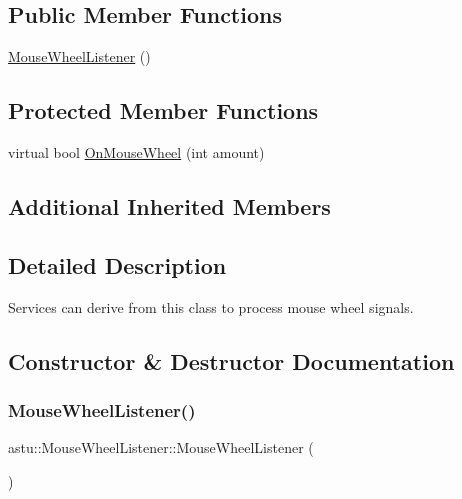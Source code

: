 \subsection*{Public Member Functions}
\begin{DoxyCompactItemize}
\item 
\hyperlink{classastu_1_1MouseWheelListener_a26643f83945f7a7078966f5098507166}{Mouse\+Wheel\+Listener} ()
\end{DoxyCompactItemize}
\subsection*{Protected Member Functions}
\begin{DoxyCompactItemize}
\item 
virtual bool \hyperlink{classastu_1_1MouseWheelListener_ae159bccdfb49aadd58079fb6ce32e914}{On\+Mouse\+Wheel} (int amount)
\end{DoxyCompactItemize}
\subsection*{Additional Inherited Members}


\subsection{Detailed Description}
Services can derive from this class to process mouse wheel signals. 

\subsection{Constructor \& Destructor Documentation}
\mbox{\label{classastu_1_1MouseWheelListener_a26643f83945f7a7078966f5098507166}} 
\subsubsection{\texorpdfstring{Mouse\+Wheel\+Listener()}{MouseWheelListener()}}
{\footnotesize\ttfamily astu\+::\+Mouse\+Wheel\+Listener\+::\+Mouse\+Wheel\+Listener (\begin{DoxyParamCaption}{ }\end{DoxyParamCaption})\hspace{0.3cm}{\ttfamily [inline]}}

